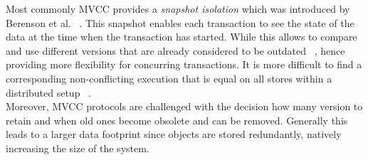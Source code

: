 Most commonly MVCC provides a \emph{snapshot isolation} which was introduced by Berenson et al. ~\cite{berenson:1995}.
This snapshot enables each transaction to see the state of the data at the time when the transaction has started.
While this allows to compare and use different versions that are already considered to be outdated ~\cite{faleiro:2015}, 
hence providing more flexibility for concurring transactions. It is more difficult to find a corresponding non-conflicting 
execution that is equal on all stores within a distributed setup ~\cite{fekete:2005, daudjee:2006}.\\

Moreover, MVCC protocols are challenged with the decision how many version to retain and when old ones become obsolete and can be removed. 
Generally this leads to a larger data footprint since objects are stored redundantly, natively increasing the size of the system. 
